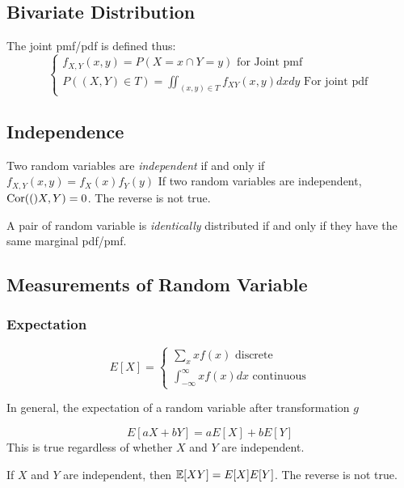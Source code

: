 \subsection{Bivariate Distribution}
The joint pmf/pdf is defined thus:
\begin{equation}
	\begin{cases}
		f_{X,Y}(x,y) = P(X=x\cap Y=y) \text{ for Joint pmf}\\
		P((X,Y)\in T) = \displaystyle \iint _{(x,y)\in T}f_{XY}(x,y)dxdy \text{ For joint pdf}
	\end{cases}
\end{equation}

\subsection{Independence}
Two random variables are \emph{independent} if and only if $f_{X,Y}(x,y)=f_X(x)f_Y(y)$
If two random variables are independent, $\text{Cor}(()X,Y)=0$. The reverse is not true.

A pair of random variable is \emph{identically} distributed if and only if they have the same marginal pdf/pmf.

\subsection{Measurements of Random Variable}
\subsubsection{Expectation}
\begin{definition}[Expectation]
\begin{equation}
	E[X] = \begin{cases}
		\sum_x xf(x) \text{ discrete}\\
		\int_{-\infty}^{\infty} xf(x) dx \text{ continuous}
	\end{cases}
\end{equation}
\end{definition}

In general, the expectation of a random variable after transformation $g$ 
\begin{theorem}
	\[E[aX+bY] = aE[X]+bE[Y]\]
	This is true regardless of whether $X$ and $Y$ are independent.

If $X$ and $Y$ are independent, then $\mathbb{E}[XY]=E[X]E[Y]$. The reverse is not true.
\end{theorem}


